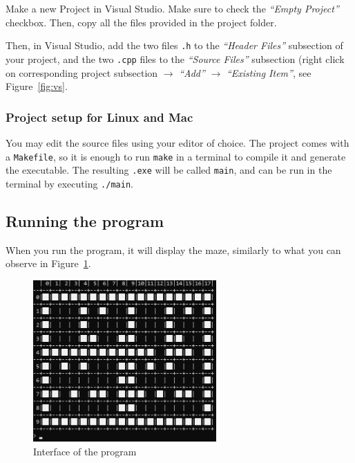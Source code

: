 \documentclass[../en-fa-lab.tex]{subfiles}
\begin{document}
Make a new Project in Visual Studio. Make sure to check the \textit{``Empty Project''} checkbox. Then, copy all the files provided in the project folder.

Then, in Visual Studio, add the two files \texttt{.h} to the \textit{``Header Files''} subsection of your project, and the two  \texttt{.cpp} files to the \textit{``Source Files''} subsection (right click on corresponding project subsection  $\rightarrow$ \textit{``Add''} $\rightarrow$ \textit{``Existing Item''}, see Figure~\ref{fig:vs}.

\subsubsection{Project setup for Linux and Mac}
You may edit the source files using your editor of choice. The project comes with a \texttt{Makefile}, so it is enough to run \texttt{make} in a terminal to compile it and generate the executable. The resulting \texttt{.exe} will be called \texttt{main}, and can be run in the terminal by executing \texttt{./main}.

\subsection{Running the program}
When you run the program, it will display the maze, similarly to what you can observe in Figure~\ref{fig:grid1}.

\begin{figure}[h]
    \centering
    \includegraphics[width=7cm]{../Resources/lab9/grid1.png}
    \caption{Interface of the program}
    \label{fig:grid1}
\end{figure}
\end{document}
